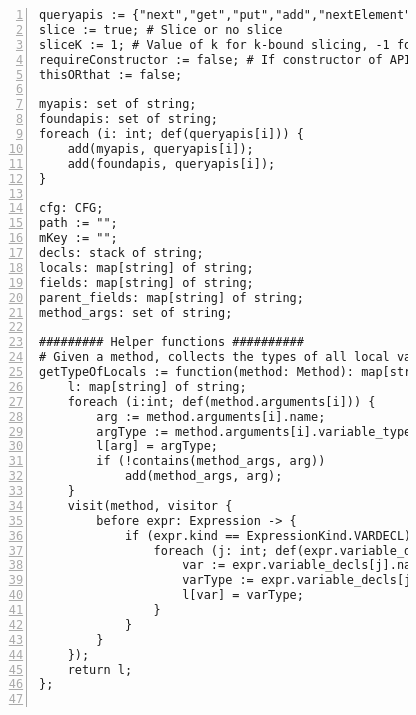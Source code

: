 \begin{figure}[ht!]
\begin{lstlisting}[numbers=left, tabsize=4, escapechar=@, caption={API Usage Mining Analysis},label={lst:aun-code}, lastline = 10]
queryapis := {"next","get","put","add","nextElement","elementAt","size","remove","nextToken","toArray","getString","group","getProperty","iterator","addElement","info","compile","containsKey","matcher","setProperty","contains","fine","set","keySet","addAll","nextInt","log","entrySet","pop","warning","asList","getTime","push","indexOf","subList","fill","values","clear","getTimeZone","hasNext","getBundle","sort","finest","getLogger","end","start","store","removeElementAt","setTime","removeFirst","severe","finer","copyInto","getKey","peek","insertElementAt","hasMoreTokens","getValue","getName","previous","compare","getBoolean","isEmpty","copyOf","load","elements","getInputStream","getInt","schedule","removeElement","firstElement","appendReplacement","userNodeForPackage","setElementAt","putAll","unmodifiableList","replaceAll","write","split","nextLine","hasMoreElements","after","noneOf","removeLast","before","removeAll","listIterator","addLast","cancel","groupCount","putInt","equals","addFirst","toString","singleton","singletonList","node","getFirst","matches","keys","putBoolean","getLast","copyOfRange","binarySearch","compareTo","isDirectory","scheduleAtFixedRate","nextSetBit","hashCode","setTimeInMillis","config","allOf","getLanguage","poll","find","entering","first","setSize","lastElement","replaceFirst","compareAndSet","putIfAbsent"}; # API methods
slice := true; # Slice or no slice
sliceK := 1; # Value of k for k-bound slicing, -1 for infinity
requireConstructor := false; # If constructor of API class are of interest
thisORthat := false;

myapis: set of string;
foundapis: set of string;
foreach (i: int; def(queryapis[i])) {
    add(myapis, queryapis[i]);   
    add(foundapis, queryapis[i]);
}

cfg: CFG;
path := "";
mKey := "";
decls: stack of string;
locals: map[string] of string;
fields: map[string] of string;
parent_fields: map[string] of string;
method_args: set of string;

######### Helper functions ##########
# Given a method, collects the types of all local variables including method parameters
getTypeOfLocals := function(method: Method): map[string] of string {
    l: map[string] of string;
    foreach (i:int; def(method.arguments[i])) {
        arg := method.arguments[i].name;
        argType := method.arguments[i].variable_type.name;
        l[arg] = argType;
        if (!contains(method_args, arg))
            add(method_args, arg);
    }
    visit(method, visitor {
        before expr: Expression -> {            
            if (expr.kind == ExpressionKind.VARDECL) {
                foreach (j: int; def(expr.variable_decls[j])) {
                    var := expr.variable_decls[j].name;
                    varType := expr.variable_decls[j].variable_type.name;
                    l[var] = varType;
                }
            }
        }
    });
    return l;
};


\end{lstlisting}
\end{figure}
